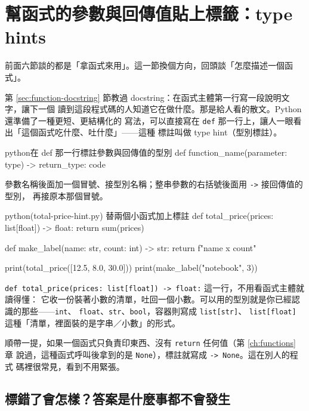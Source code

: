 \section{幫函式的參數與回傳值貼上標籤：type hints}
\label{sec:type-hints}

前面六節談的都是「拿函式來用」。這一節換個方向，回頭談「怎麼描述一個函式」。

第 \ref{sec:function-docstring} 節教過 docstring：在函式主體第一行寫一段說明文字，讓下一個
讀到這段程式碼的人知道它在做什麼。那是給人看的散文。Python 還準備了一種更短、更結構化的
寫法，可以直接寫在 \texttt{def} 那一行上，讓人一眼看出「這個函式吃什麼、吐什麼」——這種
標註叫做 type hint（型別標註）。

\begin{code}{python}{在 def 那一行標註參數與回傳值的型別}
def function_name(parameter: type) -> return_type:
    code
\end{code}

參數名稱後面加一個冒號、接型別名稱；整串參數的右括號後面用 \texttt{->} 接回傳值的型別，
再接原本那個冒號。

\begin{example}{python}{(total-price-hint.py) 替兩個小函式加上標註}
def total_price(prices: list[float]) -> float:
    return sum(prices)


def make_label(name: str, count: int) -> str:
    return f"{name} x {count}"


print(total_price([12.5, 8.0, 30.0]))
print(make_label("notebook", 3))
\end{example}


\texttt{def total\_price(prices: list[float]) -> float:} 這一行，不用看函式主體就讀得懂：
它收一份裝著小數的清單，吐回一個小數。可以用的型別就是你已經認識的那些——\texttt{int}、
\texttt{float}、\texttt{str}、\texttt{bool}，容器則寫成 \texttt{list[str]}、
\texttt{list[float]} 這種「清單，裡面裝的是字串／小數」的形式。

順帶一提，如果一個函式只負責印東西、沒有 \texttt{return} 任何值（第 \ref{ch:functions} 章
說過，這種函式呼叫後拿到的是 \texttt{None}），標註就寫成 \texttt{-> None}。這在別人的程式
碼裡很常見，看到不用緊張。

\subsection*{標錯了會怎樣？答案是什麼事都不會發生}

